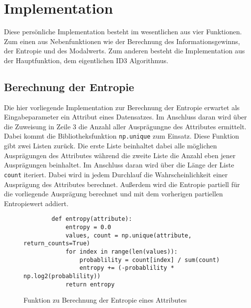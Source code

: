 \section{Implementation}
\label{id3:implementation}

Diese persönliche Implementation besteht im wesentlichen aus vier Funktionen. Zum einen aus Nebenfunktionen wie der Berechnung des Informationsgewinns, der Entropie und des Modalwerts. Zum anderen besteht die Implementation aus der Hauptfunktion, dem eigentlichen ID3 Algorithmus.


\subsection{Berechnung der Entropie}
\label{id3:implementation-entropie}
Die hier vorliegende Implementation zur Berechnung der Entropie erwartet als Eingabeparameter ein Attribut eines Datensatzes. Im Anschluss daran wird über die Zuweisung in Zeile 3 die Anzahl aller Ausprägungne des Attributes ermittelt. Dabei kommt die Bibliotheksfunktion \texttt{np.unique} zum Einsatz. Diese Funktion gibt zwei Listen zurück. Die erste Liste beinhaltet dabei alle möglichen Ausprägungen des Attributes während die zweite Liste die Anzahl eben jener Ausprägungen beinhaltet. Im Anschluss daran wird über die Länge der Liste \texttt{count} iteriert. Dabei wird in jedem Durchlauf die Wahrscheinlichkeit einer Ausprägung des Attributes berechnet. Außerdem wird die Entropie partiell für die vorliegende Ausprägung berechnet und mit dem vorherigen partiellen Entropiewert addiert.

\begin{figure}[htbp]
    \vspace{0.5cm}
    \centering
    \begin{verbatim}
        def entropy(attribute):
            entropy = 0.0
            values, count = np.unique(attribute, return_counts=True)
            for index in range(len(values)):
                probablility = count[index] / sum(count)
                entropy += (-probablility * np.log2(probablility))
            return entropy
    \end{verbatim}
    \caption{Funktion zu Berechnung der Entropie eines Attributes\autocites{PythonCourseDecisionTrees:online}{ImplementationID3}}
\end{figure}

